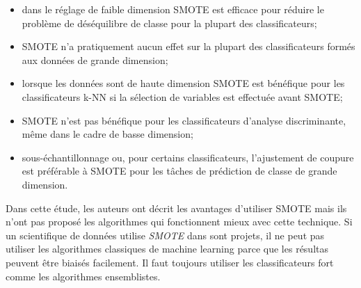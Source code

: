 \documentclass[12pt, french]{report}
\begin{document}
\begin{itemize}
\item dans le réglage de faible dimension SMOTE est efficace pour réduire le problème de déséquilibre de classe pour la plupart des classificateurs;

\item SMOTE n'a pratiquement aucun effet sur la plupart des classificateurs formés aux données de grande dimension;

\item lorsque les données sont de haute dimension SMOTE est bénéfique pour les classificateurs k-NN si la sélection de variables est effectuée avant SMOTE;

\item SMOTE n'est pas bénéfique pour les classificateurs d'analyse discriminante, même dans le cadre de basse dimension;

\item sous-échantillonnage ou, pour certains classificateurs, l'ajustement de coupure est préférable à SMOTE pour les tâches de prédiction de classe de grande dimension.

\end{itemize}

Dans cette étude, les auteurs ont décrit les avantages d'utiliser SMOTE mais ils n'ont pas proposé les algorithmes qui fonctionnent mieux avec cette technique. Si un scientifique de données utilise \textit{SMOTE} dans sont projets, il ne peut pas utiliser les algorithmes classiques de machine learning parce que les résultas peuvent être biaisés facilement. Il faut toujours utiliser les classificateurs fort comme les algorithmes ensemblistes.


  
\end{document}
